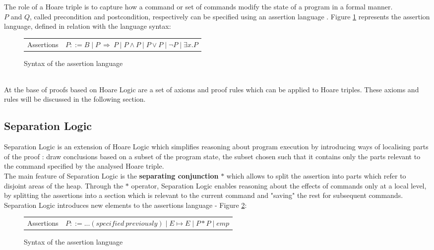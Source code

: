 \documentclass[12pt,a4paper]{article}
\begin{document}
The role of a Hoare triple is to capture how a command or set of commands modify the state of a program in a formal manner. \\

\(P\) and \(Q\), called precondition and postcondition, respectively can be specified using an assertion language . Figure \ref{fig:assertionSyntax} represents the assertion language, defined in relation with the language syntax: 
\vspace{1cm}
\begin{figure}
	\begin{tabularx}{\linewidth}{l  X}
		Assertions& \(P ::= B \mid P\ \Rightarrow\ P \mid P \land P \mid P \lor P \mid \neg P \mid {\exists x . P} \) \\
	\end{tabularx}
	\caption{Syntax of the assertion language}
	\label{fig:assertionSyntax}
\end{figure}
\\

At the base of proofs based on Hoare Logic are a set of axioms and proof rules which can be applied to Hoare triples. These axioms and rules will be discussed in the following section.
\subsection{Separation Logic}
Separation Logic is an extension of Hoare Logic which simplifies reasoning about program execution by introducing ways of localising parts of the proof : draw conclusions based on a subset of the program state, the subset chosen such that it contains only the parts relevant to the command specified by the analysed Hoare triple. \\

The main feature of Separation Logic is the \textbf{separating conjunction} \(*\) which allows to split the assertion into parts which refer to disjoint areas of the heap. Through the \(*\) operator, Separation Logic enables reasoning about the effects of commands only at a local level, by splitting the assertions into a section which is relevant to the current command and "saving" the rest for subsequent commands. \\

Separation Logic introduces new elements to the assertions language - Figure \ref{fig:SLassertionSyntax}:  \\

\begin{figure}
	\begin{tabularx}{\linewidth}{l  X}
		Assertions& \(P ::= ... (specified\ previously) \mid E \mapsto E \mid P * P \mid emp \) \\
	\end{tabularx}
	\caption{Syntax of the assertion language}
	\label{fig:SLassertionSyntax}
\end{figure}
\end{document}
